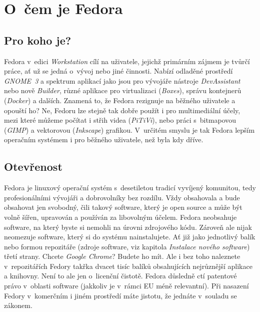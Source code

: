 \chapter*{O~čem je Fedora}
\section*{Pro koho je?}
Fedora v~edici \emph{Workstation} cílí na uživatele, jejichž primárním zájmem je tvůrčí práce, ať už se jedná o~vývoj nebo jiné činnosti. Nabízí odladěné prostředí \emph{GNOME~3} a spektrum aplikací jako jsou pro vývojáře nástroje \emph{DevAssistant} nebo nově \emph{Builder}, různé aplikace pro virtualizaci (\emph{Boxes}), správu kontejnerů (\emph{Docker}) a dalších. Znamená to, že Fedora rezignuje na běžného uživatele a opouští ho? Ne, Fedoru lze stejně tak dobře použít i pro multimediální účely, mezi které můžeme počítat i střih videa (\emph{PiTiVi}), nebo práci s~bitmapovou (\emph{GIMP}) a vektorovou (\emph{Inkscape}) grafikou. V~určitém smyslu je tak Fedora lepším operačním systémem i pro běžného uživatele, než byla kdy dříve.  

\section*{Otevřenost}
Fedora je linuxový operační systém s~desetiletou tradicí vyvíjený komunitou, tedy profesionálními vývojáři a dobrovolníky bez rozdílu. Vždy obsahovala a bude obsahovat jen svobodný, čili takový software, který je open source a může být volně šířen, upravován a používán za libovolným účelem. Fedora neobsahuje software, na který byste si nemohli  na úrovni zdrojového kódu. Zároveň ale nijak neomezuje software, který si do systému nainstalujete. Ať již jako jednotlivý balík nebo formou repozitáře (zdroje software, viz kapitola {\it Instalace nového software}) %
třetí strany. Chcete \emph{Google Chrome}? Budete ho mít. Ale i bez toho naleznete v~repozitářích Fedory takřka dvacet tisíc balíků obsahujících nejrůznější aplikace a knihovny. Není to ale jen o~licenční čistotě. Fedora důsledně ctí patentové právo v~oblasti software (jakkoliv je v~rámci EU méně relevantní). Při nasazení Fedory v~komerčním i jiném prostředí máte jistotu, že jednáte v~souladu se zákonem.

